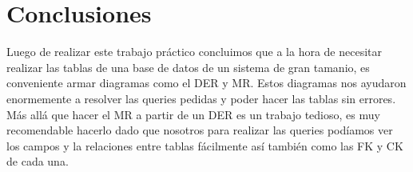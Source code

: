 \documentclass[a4paper, 10pt, twoside]{article}
\begin{document}
\section{Conclusiones}

Luego de realizar este trabajo pr\'actico concluimos que a la hora de necesitar realizar las tablas de una base de datos de un sistema de gran tamanio, es conveniente armar diagramas como el DER y MR. 
Estos diagramas nos ayudaron enormemente a resolver las queries pedidas y poder hacer las tablas sin errores. 
M\'as all\'a que hacer el MR a partir de un DER es un trabajo tedioso, es muy recomendable hacerlo dado que nosotros para realizar las queries pod\'iamos ver los campos y la relaciones entre tablas f\'acilmente as\'i tambi\'en como las FK y CK de cada una.
\end{document}
